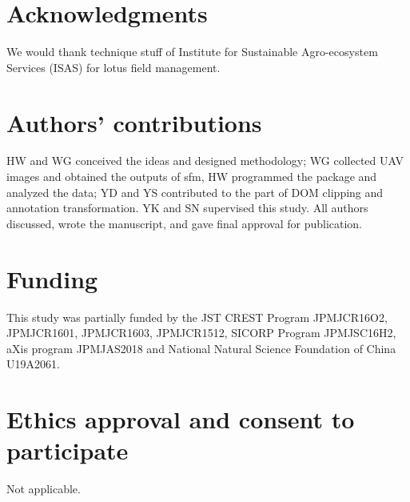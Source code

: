 \documentclass[doublespacing]{configs/bmcart}
\begin{document}


\begin{backmatter}

\renewcommand*{\glsgroupskip}{}
\printglossary[type=\acronymtype, title=Abbreviations, nonumberlist]

\section*{Acknowledgments}
We would thank technique stuff of Institute for Sustainable Agro-ecosystem Services (ISAS) for lotus field management.

\section*{Authors' contributions}
HW and WG conceived the ideas and designed methodology; WG collected UAV images and obtained the outputs of \acrshort*{sfm}, HW programmed the package and analyzed the data; YD and YS contributed to the part of DOM clipping and annotation transformation. YK and SN supervised this study. All authors discussed, wrote the manuscript, and gave final approval for publication.

\section*{Funding}
This study was partially funded by the JST CREST Program JPMJCR16O2, JPMJCR1601, JPMJCR1603, JPMJCR1512, SICORP Program JPMJSC16H2, aXis program JPMJAS2018 and National Natural Science Foundation of China U19A2061.

\section*{Ethics approval and consent to participate}
Not applicable.


\end{backmatter}
\end{document}
